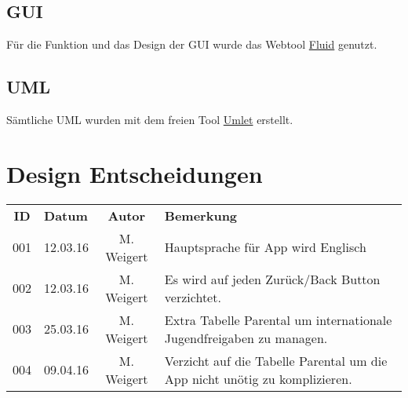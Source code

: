 \subsection{GUI}

Für die Funktion und das Design der GUI wurde das Webtool \href{https://www.fluidui.com}{Fluid} genutzt.

\subsection{UML}

Sämtliche UML wurden mit dem freien Tool \href{http://www.umlet.com}{Umlet} erstellt.  

\section{Design Entscheidungen}

\begin{tabular}{|c|l|c|l|}
	\rowcolor{black} {\color{white}\textbf{ID}} & {\color{white}\textbf{Datum}} & {\color{white}\textbf{Autor}} & {\color{white}\textbf{Bemerkung}} \\
	001 & 12.03.16 & M. Weigert & Hauptsprache für App wird Englisch \\ \hline
	\rowcolor{DarkSeaGreen} 002 & 12.03.16 & M. Weigert & Es wird auf jeden Zurück/Back Button verzichtet. \\ \hline
	003 & 25.03.16 & M. Weigert & Extra Tabelle Parental um internationale Jugendfreigaben zu managen. \\ \hline
	\rowcolor{DarkSeaGreen} 004 & 09.04.16 & M. Weigert & Verzicht auf die Tabelle Parental um die App nicht unötig zu komplizieren. \\ \hline
\end{tabular}